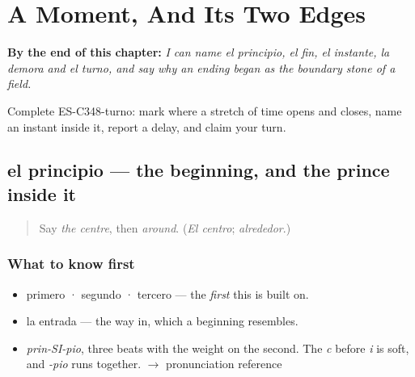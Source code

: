 
\chapter{A Moment, And Its Two Edges}
\label{ch:el-principio-y-el-fin}

\begin{chapteropening}
\textbf{By the end of this chapter:} \emph{I can name el principio, el fin, el instante, la demora and el turno, and say why an ending began as the boundary stone of a field.}

Complete ES-C348-turno: mark where a stretch of time opens and closes, name an instant inside it, report a delay, and claim your turn.
\end{chapteropening}

\section[el principio]{el principio — the beginning, and the prince inside it}

\label{lesson:ES-C348-principio}



\begin{quote}
Say \emph{the centre}, then \emph{around}. (\emph{El centro}; \emph{alrededor}.)
\end{quote}

\subsection*{What to know first}
\begin{itemize}
\raggedright
  \item primero · segundo · tercero — the \emph{first} this is built on.
  \item la entrada — the way in, which a beginning resembles.
\end{itemize}

\begin{sounds}
\begin{itemize}
\raggedright
  \item \emph{prin-SI-pio}, three beats with the weight on the second. The \emph{c} before \emph{i} is soft, and \emph{-pio} runs together. $\to$ pronunciation reference
\end{itemize}
\end{sounds}

